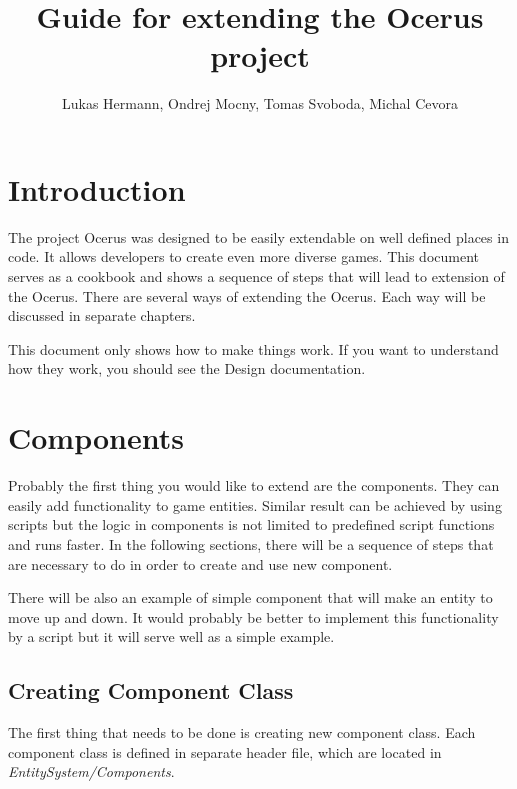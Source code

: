 \documentclass[a4paper, 12pt]{report}
\begin{document}
\pagestyle{empty} %

\title{Guide for extending the Ocerus project}
\author{Lukas Hermann, Ondrej Mocny, Tomas Svoboda, Michal Cevora}

\pagestyle{plain} %

\tableofcontents %
\cleardoublepage %

\chapter{Introduction}

The project Ocerus was designed to be easily extendable on well defined places in code. It allows developers to create even more diverse games. This document serves as a cookbook and shows a sequence of steps that will lead to extension of the Ocerus. There are several ways of extending the Ocerus. Each way will be discussed in separate chapters.

This document only shows how to make things work. If you want to understand how they work, you should see the Design documentation.

\chapter{Components}

Probably the first thing you would like to extend are the components. They can easily add functionality to game entities. Similar result can be achieved by using scripts but the logic in components is not limited to predefined script functions and runs faster. In the following sections, there will be a sequence of steps that are necessary  to do in order to create and use new component. 

There will be also an example of simple component that will make an entity to move up and down. It would probably be better to implement this functionality by a script but it will serve well as a simple example.

\section{Creating Component Class}
The first thing that needs to be done is creating new component class. Each component class is defined in separate header file, which are located in \emph{EntitySystem/Components}.
\end{document}

